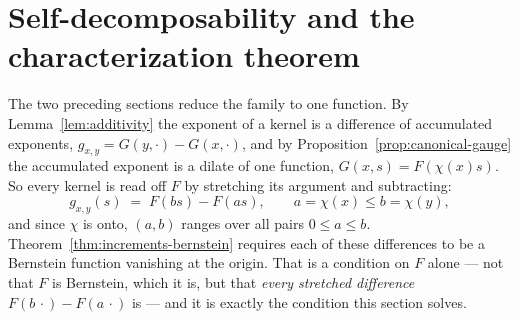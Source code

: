 
\section{Self-decomposability and the characterization theorem}\label{sec:characterization}

The two preceding sections reduce the family to one function. By
Lemma~\ref{lem:additivity} the exponent of a kernel is a difference of accumulated
exponents, $g_{x,y} = G(y,\cdot) - G(x,\cdot)$, and by Proposition~\ref{prop:canonical-gauge}
the accumulated exponent is a dilate of one function, $G(x,s) = F(\chi(x)s)$. So every kernel
is read off $F$ by stretching its argument and subtracting:
\[
  g_{x,y}(s) \;=\; F(bs) - F(as), \qquad a = \chi(x) \le b = \chi(y),
\]
and since $\chi$ is onto, $(a,b)$ ranges over all pairs $0 \le a \le b$. Theorem~\ref{thm:increments-bernstein}
requires each of these differences to be a Bernstein function vanishing at the origin. That
is a condition on $F$ alone --- not that $F$ is Bernstein, which it is, but that
\emph{every stretched difference} $F(b\,\cdot) - F(a\,\cdot)$ is --- and it is exactly the
condition this section solves.

